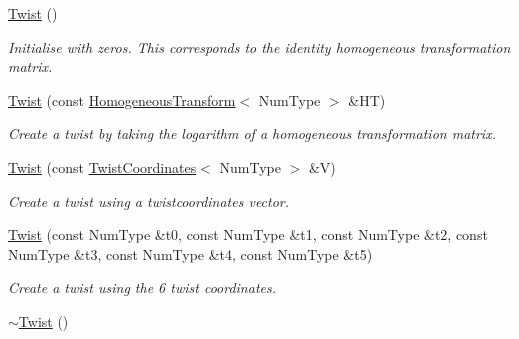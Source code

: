 \begin{DoxyCompactItemize}
\item 
\hypertarget{singletonscrews_1_1_twist_a7118e956ac794dffba45d6092f6d7996}{\hyperlink{singletonscrews_1_1_twist_a7118e956ac794dffba45d6092f6d7996}{Twist} ()}\label{singletonscrews_1_1_twist_a7118e956ac794dffba45d6092f6d7996}

\begin{DoxyCompactList}\small\item\em Initialise with zeros. This corresponds to the identity homogeneous transformation matrix. \end{DoxyCompactList}\item 
\hyperlink{singletonscrews_1_1_twist_a44e612e3a701624c465613e5ec4554e4}{Twist} (const \hyperlink{classscrews_1_1_homogeneous_transform}{Homogeneous\+Transform}$<$ Num\+Type $>$ \&H\+T)
\begin{DoxyCompactList}\small\item\em Create a twist by taking the logarithm of a homogeneous transformation matrix. \end{DoxyCompactList}\item 
\hyperlink{singletonscrews_1_1_twist_a1f20769c6812d4d8642499beab0ea9dd}{Twist} (const \hyperlink{singletonscrews_1_1_vector6}{Twist\+Coordinates}$<$ Num\+Type $>$ \&V)
\begin{DoxyCompactList}\small\item\em Create a twist using a twistcoordinates vector. \end{DoxyCompactList}\item 
\hyperlink{singletonscrews_1_1_twist_ab10fbc50e3313713ea91090baec58069}{Twist} (const Num\+Type \&t0, const Num\+Type \&t1, const Num\+Type \&t2, const Num\+Type \&t3, const Num\+Type \&t4, const Num\+Type \&t5)
\begin{DoxyCompactList}\small\item\em Create a twist using the 6 twist coordinates. \end{DoxyCompactList}\item 
\hypertarget{singletonscrews_1_1_twist_a3cf2b76b6a3b561f01f5050c430755c3}{\hyperlink{singletonscrews_1_1_twist_a3cf2b76b6a3b561f01f5050c430755c3}{$\sim$\+Twist} ()}\label{singletonscrews_1_1_twist_a3cf2b76b6a3b561f01f5050c430755c3}


\end{DoxyCompactItemize}
